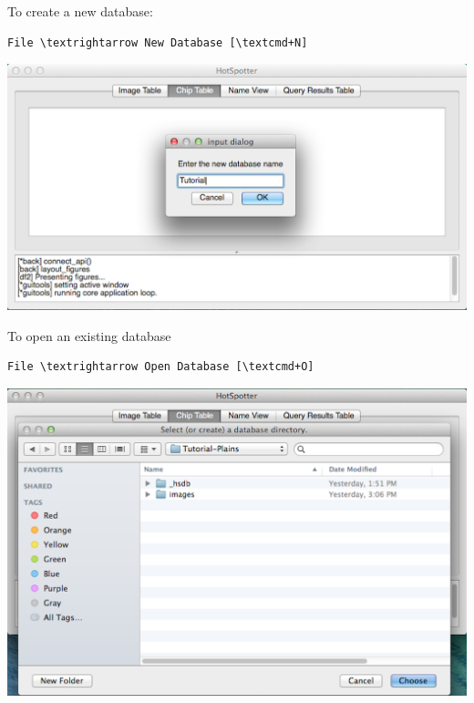 \documentclass[a4paper,10pt]{article}
\begin{document}
    \renewcommand{\textrightarrow}{$\rightarrow$}
    \newcommand{\textcmd}{\cmdkey}

    To create a new database: \\
    \begin{Verbatim}[commandchars=\\\{\}]
    File \textrightarrow New Database [\textcmd+N]
    \end{Verbatim}

    \begin{center}
        \includegraphics[scale=0.15]{images/start-new.png}
    \end{center}

    To open an existing database
    \begin{Verbatim}[commandchars=\\\{\}]
    File \textrightarrow Open Database [\textcmd+O]
    \end{Verbatim}

    \begin{center}
        \includegraphics[scale=0.15]{images/start-open.png}
    \end{center}
\end{document}
